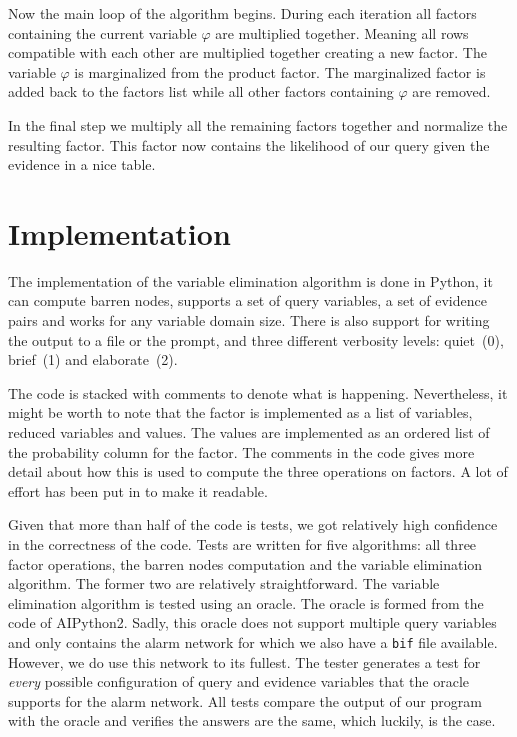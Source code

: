 \documentclass[a4paper]{article}
\begin{document}
Now the main loop of the algorithm begins. During each iteration all factors
containing the current variable $\varphi$ are multiplied together. Meaning all
rows compatible with each other are multiplied together creating a new factor.
The variable $\varphi$ is marginalized from the product factor. The
marginalized factor is added back to the factors list while all other factors
containing $\varphi$ are removed.

In the final step we multiply all the remaining factors together and normalize
the resulting factor. This factor now contains the likelihood of our query
given the evidence in a nice table.

\section{Implementation}\label{sec: implementation}
The implementation of the variable elimination algorithm is done in Python, it
can compute barren nodes, supports a set of query variables, a set of evidence
pairs and works for any variable domain size. There is also support for writing
the output to a file or the prompt, and three different verbosity levels:
quiet~(0), brief~(1) and elaborate~(2).

The code is stacked with comments to denote what is happening. Nevertheless, it
might be worth to note that the factor is implemented as a list of variables,
reduced variables and values. The values are implemented as an ordered list of
the probability column for the factor. The comments in the code gives more
detail about how this is used to compute the three operations on factors. A lot
of effort has been put in to make it readable.

Given that more than half of the code is tests, we got relatively high
confidence in the correctness of the code. Tests are written for five
algorithms: all three factor operations, the barren nodes computation and the
variable elimination algorithm. The former two are relatively straightforward.
The variable elimination algorithm is tested using an oracle. The oracle is
formed from the code of AIPython2. Sadly, this oracle does not support multiple
query variables and only contains the alarm network for which we also have a
\texttt{bif} file available. However, we do use this network to its fullest.
The tester generates a test for \textit{every} possible configuration of query
and evidence variables that the oracle supports for the alarm network. All
tests compare the output of our program with the oracle and verifies the
answers are the same, which luckily, is the case.
\end{document}
